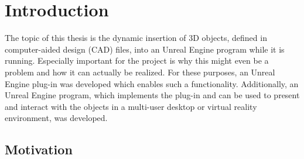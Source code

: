 \chapter{Introduction}
The topic of this thesis is the dynamic insertion of 3D objects, defined in computer-aided design (\acs{CAD}) files, into an Unreal Engine program while it is running. Especially important for the project is why this might even be a problem and how it can actually be realized. For these purposes, an Unreal Engine plug-in was developed which enables such a functionality. Additionally, an Unreal Engine program, which implements the plug-in and can be used to present and interact with the objects in a multi-user desktop or virtual reality environment, was developed.

\section{Motivation}


